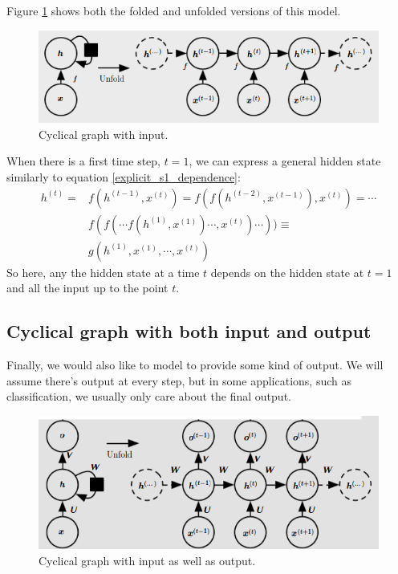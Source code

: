 \documentclass[12pt, a4paper]{article}
\numberwithin{equation}{section}
\begin{document}
Figure \ref{fig:cyclical_with_input} shows both the folded and unfolded versions of this model.

\begin{figure}
\centering
\includegraphics[width=\textwidth]{cyclical_with_input}
\caption{Cyclical graph with input.}
\label{fig:cyclical_with_input}
\end{figure}

When there is a first time step, $t=1$, we can express a general hidden state similarly to equation \ref{explicit_s1_dependence}:
\begin{align}
h^{(t)}=&f(h^{(t-1)}, x^{(t)})=f(f(h^{(t-2)}, x^{(t-1)}), x^{(t)})=\cdots\\
&f(f(\cdots f(h^{(1)},x^{(1)})\cdots,x^{(t)})\cdots))\equiv\\
&g(h^{(1)},x^{(1)},\cdots,x^{(t)})
\end{align}
So here, any the hidden state at a time $t$ depends on the hidden state at $t=1$ and all the input up to the point $t$.

\subsection{Cyclical graph with both input and output}
Finally, we would also like to model to provide some kind of output. We will assume there's output at every step, but in some applications, such as classification, we usually only care about the final output. 

\begin{figure}
\centering
\includegraphics[width=\textwidth]{cyclical_input_output}
\caption{Cyclical graph with input as well as output.}
\label{fig:cyclical_input_output}
\end{figure}
\end{document}
